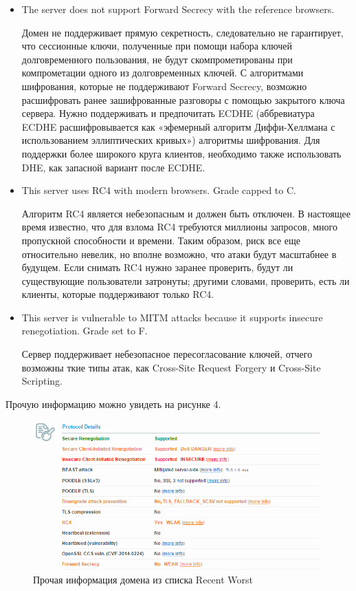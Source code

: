 \documentclass[11pt, a4paper]{article}		%
\begin{document}
\begin{itemize}

\item The server does not support Forward Secrecy with the reference browsers.

Домен не поддерживает прямую секретность, следовательно не гарантирует, что сессионные ключи, полученные при помощи набора ключей долговременного пользования, не будут скомпрометированы при компрометации одного из долговременных ключей.
С алгоритмами шифрования, которые не поддерживают Forward Secrecy, возможно расшифровать ранее зашифрованные разговоры с помощью закрытого ключа сервера. Нужно поддерживать и предпочитать ECDHE (аббревиатура ECDHE расшифровывается как «эфемерный алгоритм Диффи-Хеллмана с использованием эллиптических кривых») алгоритмы шифрования. Для поддержки более широкого круга клиентов, необходимо также использовать DHE, как запасной вариант после ECDHE.

\item This server uses RC4 with modern browsers. Grade capped to C.

Алгоритм RC4 является небезопасным и должен быть отключен. В настоящее время известно, что для взлома RC4 требуются миллионы запросов, много пропускной способности и времени. Таким образом, риск все еще относительно невелик, но вполне возможно, что атаки будут масштабнее в будущем. Если снимать RC4 нужно заранее проверить, будут ли существующие пользователи затронуты; другими словами, проверить, есть ли клиенты, которые поддерживают только RC4.

\item This server is vulnerable to MITM attacks because it supports insecure renegotiation. Grade set to F.

Сервер поддерживает небезопасное пересогласование ключей, отчего возможны ткие типы атак, как Cross-Site Request Forgery и Cross-Site Scripting.

\end{itemize}

Прочую информацию можно увидеть на рисунке 4.

\begin{figure}[h!]
\centering
\includegraphics[scale=0.8]{res/4}
\caption{Прочая информация домена из списка Recent Worst}
\end{figure}
\end{document}
